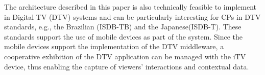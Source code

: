 \documentclass[journal]{IEEEtran}
\begin{document}
The architecture described in this paper is also technically feasible to implement in Digital TV (DTV) systems and can be particularly interesting for CPs in DTV standards, e.g., the Brazilian (ISDB-TB) and the Japanese(ISDB-T). These standards support the use of mobile devices as part of the system. Since the mobile devices support the implementation of the DTV middleware, a cooperative exhibition of the DTV application can be managed with the iTV device, thus enabling the capture of viewers' interactions and contextual data.





\end{document}

